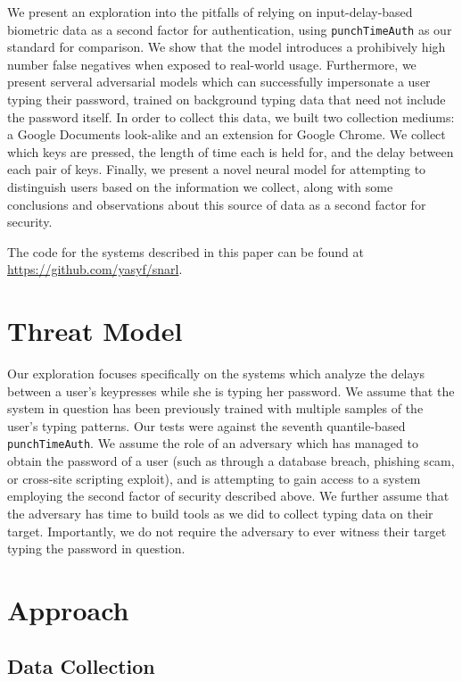\documentclass[9pt,journal]{IEEEtran}
\begin{document}
We present an exploration into the pitfalls of relying on input-delay-based biometric data as a second factor for authentication, using \texttt{punchTimeAuth} as our standard for comparison. We show that the model introduces a prohibively high number false negatives when exposed to real-world usage. Furthermore, we present serveral adversarial models which can successfully impersonate a user typing their password, trained on background typing data that need not include the password itself. In order to collect this data, we built two collection mediums: a Google Documents look-alike and an extension for Google Chrome. We collect which keys are pressed, the length of time each is held for, and the delay between each pair of keys. Finally, we present a novel neural model for attempting to distinguish users based on the information we collect, along with some conclusions and observations about this source of data as a second factor for security.

The code for the systems described in this paper can be found at \url{https://github.com/yasyf/snarl}.

\section{Threat Model}

Our exploration focuses specifically on the systems which analyze the delays between a user's keypresses while she is typing her password. We assume that the system in question has been previously trained with multiple samples of the user's typing patterns. Our tests were against the seventh quantile-based \texttt{punchTimeAuth}. We assume the role of an adversary which has managed to obtain the password of a user (such as through a database breach, phishing scam, or cross-site scripting exploit), and is attempting to gain access to a system employing the second factor of security described above. We further assume that the adversary has time to build tools as we did to collect typing data on their target. Importantly, we do not require the adversary to ever witness their target typing the password in question.

\section{Approach}
\subsection{Data Collection}
\end{document}
